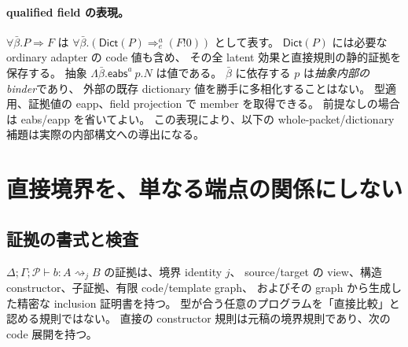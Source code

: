 \documentclass[11pt,a4paper]{article}
\newcommand{\Dict}{\mathsf{Dict}}
\newcommand{\Ctx}{\Delta;\Gamma;\mathcal P}
\newcommand{\Dir}{\mathrel{\rightsquigarrow}}
\begin{document}
\paragraph{qualified field の表現。}
\(\forall\bar\beta.P\Rightarrow F\) は
\(\forall\bar\beta.(\Dict(P)\Rightarrow_e^a(F!0))\) として表す。
\(\Dict(P)\) には必要な ordinary adapter の code 値も含め、
その全 latent 効果と直接規則の静的証拠を保存する。
抽象 \(\Lambda\bar\beta.\mathsf{eabs}^{a}\ p.N\) は値である。
\(\bar\beta\) に依存する \(p\) は\emph{抽象内部の binder}であり、
外部の既存 dictionary 値を勝手に多相化することはない。
型適用、証拠値の eapp、field projection で member を取得できる。
前提なしの場合は eabs/eapp を省いてよい。
この表現により、以下の whole-packet/dictionary 補題は実際の内部構文への導出になる。

\section{直接境界を、単なる端点の関係にしない}
\label{sec:boundary}

\subsection{証拠の書式と検査}

\(\Ctx\vdash b:A\Dir_j B\) の証拠は、境界 identity \(j\)、
source/target の view、構造 constructor、子証拠、有限 code/template graph、
およびその graph から生成した精密な inclusion 証明書を持つ。
型が合う任意のプログラムを「直接比較」と認める規則ではない。
直接の constructor 規則は元稿の境界規則であり、次の code 展開を持つ。
\end{document}
